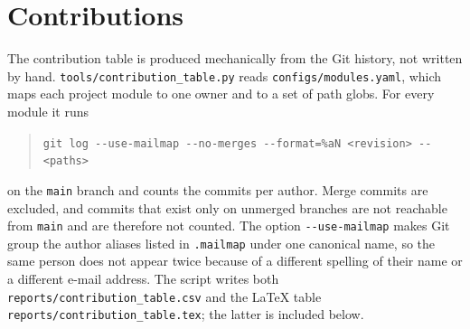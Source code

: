 \section{Contributions}
\label{sec:contributions}

The contribution table is produced mechanically from the Git history, not written by hand. \texttt{tools/contribution\_table.py} reads \texttt{configs/modules.yaml}, which maps each project module to one owner and to a set of path globs. For every module it runs

\begin{quote}
\texttt{git log -{}-use-mailmap -{}-no-merges -{}-format=\%aN <revision> -{}- <paths>}
\end{quote}

on the \texttt{main} branch and counts the commits per author. Merge commits are excluded, and commits that exist only on unmerged branches are not reachable from \texttt{main} and are therefore not counted. The option \texttt{-{}-use-mailmap} makes Git group the author aliases listed in \texttt{.mailmap} under one canonical name, so the same person does not appear twice because of a different spelling of their name or a different e-mail address. The script writes both \texttt{reports/contribution\_table.csv} and the LaTeX table \texttt{reports/contribution\_table.tex}; the latter is included below.

